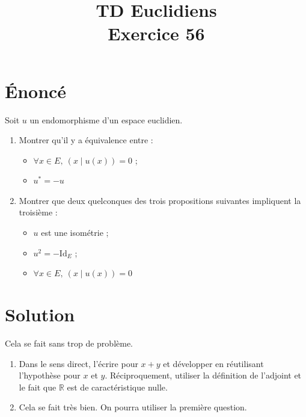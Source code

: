 \documentclass[french]{article}
\title{TD Euclidiens\\ Exercice 56}
\date{}
\newcommand{\R}{\mathbb{R}}
\newcommand{\st}{^*}
\begin{document}
\maketitle

\section{Énoncé}
Soit $u$ un endomorphisme d'un espace euclidien.
\begin{enumerate}
	\item Montrer qu'il y a équivalence entre :
	\begin{itemize}
		\item $\forall x\in E,\ (x\mid u(x))=0$ ;
		\item $u\st=-u$
	\end{itemize}
	\item Montrer que deux quelconques des trois propositions suivantes impliquent la troisième :
	\begin{itemize}
		\item $u$ est une isométrie ;
		\item $u^2=-\text{Id}_E$ ;
		\item $\forall x\in E,\ (x\mid u(x))=0$
	\end{itemize}
\end{enumerate}
\section{Solution}
Cela se fait sans trop de problème.
\begin{enumerate}
	\item Dans le sens direct, l'écrire pour $x+y$ et développer en réutilisant l'hypothèse pour $x$ et $y$. Réciproquement, utiliser la définition de l'adjoint et le fait que $\R$ est de caractéristique nulle.
	\item Cela se fait très bien. On pourra utiliser la première question.
\end{enumerate}
\end{document}

